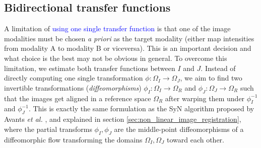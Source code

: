 \subsection{Bidirectional transfer functions}
A limitation of \textcolor{blue}{ using one single transfer function } is that one of the image modalities must be chosen \emph{a priori} as the target modality (either map intensities from modality A to modality B or viceversa). This is an important decision and what choice is the best may not be obvious in general. To overcome this limitation, we estimate both transfer functions between $I$ and $J$. Instead of directly computing one single transformation $\phi:\Omega_{I} \rightarrow \Omega_{J}$, we aim to find two invertible transformations (\emph{diffeomorphisms}) $\phi_{I}:\Omega_{I}\rightarrow \Omega_{R}$ and $\phi_{J}:\Omega_{J}\rightarrow \Omega_{R}$ such that the images get aligned in a reference space $\Omega_{R}$ after warping them under $\phi_{I}^{-1}$ and $\phi_{J}^{-1}$. This is exactly the same formulation as the SyN algorithm proposed by Avants {\it et al.} \cite{Avants2011}, and explained in section \ref{sec:non_linear_image_registration}, where the partial transforms $\phi_{I}, \phi_{J}$ are the middle-point diffeomorphisms of a diffeomorphic flow transforming the domains $\Omega_{I}, \Omega_{J}$ toward each other.\\

